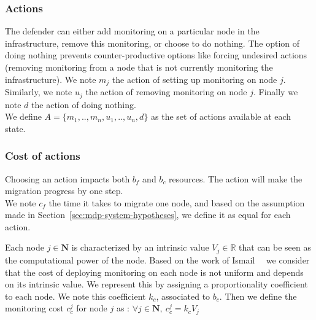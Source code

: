 \subsubsection{Actions}
\label{sec:actionset}
The defender can either add monitoring on a particular node in the infrastructure, remove this monitoring, or choose to do nothing.
The option of doing nothing prevents counter-productive options like forcing undesired actions (\eg removing monitoring from a node that is not currently monitoring the infrastructure).
We note $m_j$ the action of setting up monitoring on node $j$. Similarly, we note $u_j$ the action of removing monitoring on node $j$.
Finally we note $d$ the action of doing nothing.
\\We define $A = \{m_1,..,m_n,u_1,..,u_n,d\}$ as the set of actions available at each state.


\subsubsection{Cost of actions}
Choosing an action impacts both $b_f$ and $b_c$ resources. The action will make the migration progress by one step.\\
We note $c_f$ the time it takes to migrate one node, and based on the assumption made in Section~\ref{sec:mdp-system-hypotheses}, we define it as equal for each action.

Each node $j \in \textbf{N}$ is characterized by an intrinsic value $V_j \in \mathbb{R}$ that can be seen as the computational power of the node.
Based on the work of Ismail~\etal~\cite{interdep-ismail2017} we consider that the cost of deploying monitoring on each node is not uniform and depends on its intrinsic value. We represent this by assigning a proportionality coefficient to each node.
We note this coefficient $k_{c}$, associated to $b_c$.
Then we define the monitoring cost $c_c^j$ for node $j$ as : $\forall j \in \textbf{N},~ c_c^j = k_{c}  V_j$

